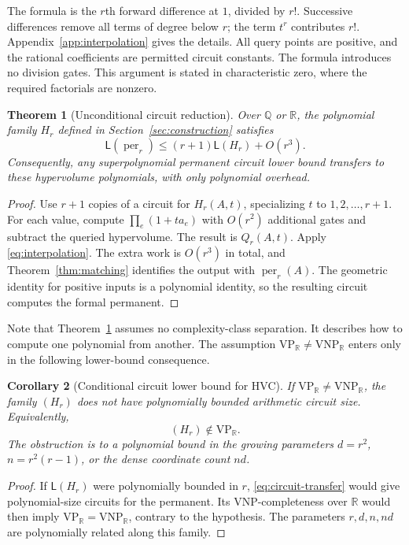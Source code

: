 \documentclass[12pt,a4paper]{article}
\newtheorem{theorem}{Theorem}[section]
\newtheorem{corollary}[theorem]{Corollary}
\theoremstyle{definition}
\theoremstyle{remark}
\newcommand{\R}{\mathbb R}
\newcommand{\Q}{\mathbb Q}
\newcommand{\per}{\operatorname{per}}
\newcommand{\VP}{\mathrm{VP}}
\newcommand{\VNP}{\mathrm{VNP}}
\newcommand{\size}{\mathsf L}
\begin{document}
The formula is the $r$th forward difference at $1$, divided by $r!$.
Successive differences remove all terms of degree below $r$; the term
$t^r$ contributes $r!$. Appendix~\ref{app:interpolation} gives the
details. All query points are positive,
and the rational coefficients are permitted circuit constants. The
formula introduces no division gates. This argument is stated in
characteristic zero, where the required factorials are nonzero.

\begin{theorem}[Unconditional circuit reduction]
\label{thm:transfer}
Over $\Q$ or $\R$, the polynomial family $H_r$ defined in
Section~\ref{sec:construction} satisfies
\begin{equation}
 \boxed{\size(\per_r)\le(r+1)\size(H_r)+O(r^3).}
 \label{eq:circuit-transfer}
\end{equation}
Consequently, any superpolynomial permanent circuit lower bound transfers
to these hypervolume polynomials, with only polynomial overhead.
\end{theorem}

\begin{proof}
Use $r+1$ copies of a circuit for $H_r(A,t)$, specializing $t$ to
$1,2,\ldots,r+1$. For each value, compute
$\prod_e(1+ta_e)$ with $O(r^2)$ additional gates and subtract the
queried hypervolume. The result is $Q_r(A,t)$. Apply
\eqref{eq:interpolation}. The extra work is $O(r^3)$ in total, and
Theorem~\ref{thm:matching} identifies the output with $\per_r(A)$.
The geometric identity for positive inputs is a polynomial identity,
so the resulting circuit computes the formal permanent.
\end{proof}

Note that Theorem~\ref{thm:transfer} assumes no complexity-class
separation. It describes how to compute one polynomial from another.
The assumption $\VP_{\R}\ne\VNP_{\R}$ enters only in the following
lower-bound consequence.

\begin{corollary}[Conditional circuit lower bound for HVC]
\label{cor:hv-lower}
If $\VP_{\R}\ne\VNP_{\R}$, the family $(H_r)$ does not have
polynomially bounded arithmetic circuit size. Equivalently,
\[
 (H_r)\notin\VP_{\R}.
\]
The obstruction is to a polynomial bound in the growing parameters
$d=r^2$, $n=r^2(r-1)$, or the dense coordinate count $nd$.
\end{corollary}

\begin{proof}
If $\size(H_r)$ were polynomially bounded in $r$,
\eqref{eq:circuit-transfer} would give polynomial-size circuits for
the permanent. Its $\VNP$-completeness over $\R$
\cite[Theorem 2]{ValiantAlgebra} would then imply
$\VP_{\R}=\VNP_{\R}$, contrary to the hypothesis.
The parameters $r,d,n,nd$ are polynomially related along this family.
\end{proof}
\end{document}
